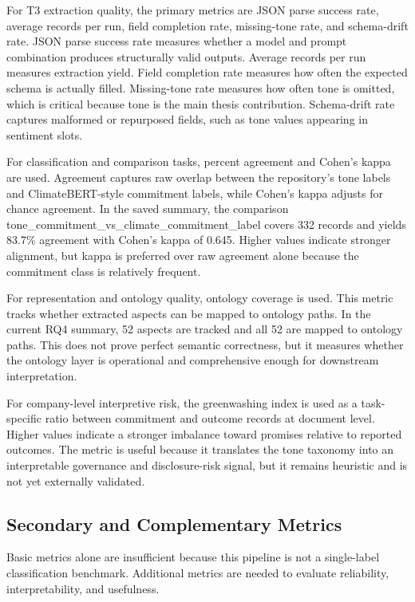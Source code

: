 \documentclass[english, online, cse, master]{dithesis}
\begin{document}
For T3 extraction quality, the primary metrics are JSON parse success rate, average records per run, field completion rate, missing-tone rate, and schema-drift rate. JSON parse success rate measures whether a model and prompt combination produces structurally valid outputs. Average records per run measures extraction yield. Field completion rate measures how often the expected schema is actually filled. Missing-tone rate measures how often tone is omitted, which is critical because tone is the main thesis contribution. Schema-drift rate captures malformed or repurposed fields, such as tone values appearing in sentiment slots.

For classification and comparison tasks, percent agreement and Cohen’s kappa are used. Agreement captures raw overlap between the repository’s tone labels and ClimateBERT-style commitment labels, while Cohen’s kappa adjusts for chance agreement. In the saved summary, the comparison tone\_commitment\_vs\_climate\_commitment\_label covers 332 records and yields 83.7\% agreement with Cohen’s kappa of 0.645. Higher values indicate stronger alignment, but kappa is preferred over raw agreement alone because the commitment class is relatively frequent.

For representation and ontology quality, ontology coverage is used. This metric tracks whether extracted aspects can be mapped to ontology paths. In the current RQ4 summary, 52 aspects are tracked and all 52 are mapped to ontology paths. This does not prove perfect semantic correctness, but it measures whether the ontology layer is operational and comprehensive enough for downstream interpretation.

For company-level interpretive risk, the greenwashing index is used as a task-specific ratio between commitment and outcome records at document level. Higher values indicate a stronger imbalance toward promises relative to reported outcomes. The metric is useful because it translates the tone taxonomy into an interpretable governance and disclosure-risk signal, but it remains heuristic and is not yet externally validated.

\subsection{Secondary and Complementary Metrics}

Basic metrics alone are insufficient because this pipeline is not a single-label classification benchmark. Additional metrics are needed to evaluate reliability, interpretability, and usefulness.
\end{document}
